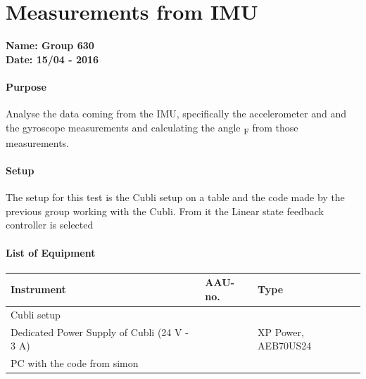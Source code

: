 \chapter{Measurements from IMU}\label{IMUMeasurementsAppendix} 
\textbf{Name: Group 630}\\
\textbf{Date: 15/04 - 2016}

\subsubsection{Purpose}
Analyse the data coming from the IMU, specifically the accelerometer and and the gyroscope measurements and calculating the angle \si{\theta_F} from those measurements.


\subsubsection{Setup}
The setup for this test is the Cubli setup on a table and the code made by the previous group working with the Cubli. From it the Linear state feedback controller is selected 

\subsubsection{List of Equipment}
\begin{table}[H]
	\begin{tabular}{|l|l|p{4.3cm}|}
		\hline%
		\textbf{Instrument}                        &  \textbf{AAU-no.}  &  \textbf{Type}       \\
		\hline%
		Cubli setup                              &               &  		  \\
		\hline%
		Dedicated Power Supply of Cubli \small{(24 V - 3 A)} &               &  XP Power, AEB70US24 \\
		\hline%
		PC with the code from simon                &              &            \\
		\hline%
	\end{tabular}
\end{table}
